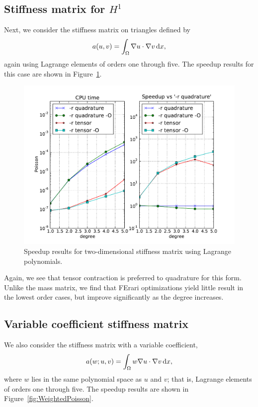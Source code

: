 \subsection{Stiffness matrix for $H^1$}

Next, we consider the stiffness matrix on triangles defined by
\begin{equation}
  a(u, v) = \int_{\Omega} \nabla u \cdot \nabla v \, \mathrm{d}x,
\end{equation}
again using Lagrange elements of orders one through five. The speedup
results for this case are shown in Figure~\ref{fig:Poisson}.

\begin{figure}
  \centering
  \includegraphics[width=\largefig]{chapters/kirby-3/pdf/Poisson.pdf}
  \caption{Speedup results for two-dimensional stiffness matrix using Lagrange polynomials.}
  \label{fig:Poisson}
\end{figure}

Again, we see that tensor contraction is preferred to quadrature for
this form. Unlike the mass matrix, we find that FErari optimizations
yield little result in the lowest order cases, but improve
significantly as the degree increases.

\subsection{Variable coefficient stiffness matrix}

We also consider the stiffness matrix with a variable coefficient,
\begin{equation}
  a(w; u, v) = \int_{\Omega} w \nabla u \cdot \nabla v \, \mathrm{d}x,
\end{equation}
where $ w $ lies in the same polynomial space as $ u $ and $ v$; that
is, Lagrange elements of orders one through five. The speedup results
are shown in Figure~\ref{fig:WeightedPoisson}.

